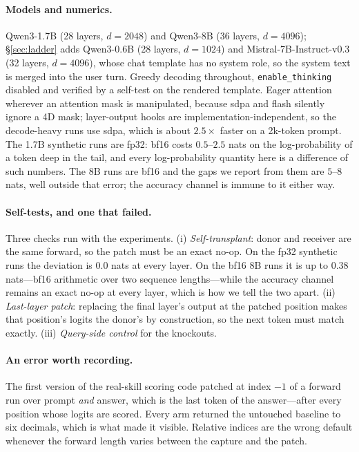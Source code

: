 \documentclass{article}
\begin{document}
\paragraph{Models and numerics.} Qwen3-1.7B (28 layers, $d=2048$) and Qwen3-8B
(36 layers, $d=4096$); \S\ref{sec:ladder} adds Qwen3-0.6B (28 layers, $d=1024$)
and Mistral-7B-Instruct-v0.3 (32 layers, $d=4096$), whose chat template has no
system role, so the system text is merged into the user turn. Greedy decoding throughout, \texttt{enable\_thinking}
disabled and verified by a self-test on the rendered template. Eager attention
wherever an attention mask is manipulated, because sdpa and flash silently
ignore a 4D mask; layer-output hooks are implementation-independent, so the
decode-heavy runs use sdpa, which is about $2.5\times$ faster on a 2k-token
prompt. The 1.7B synthetic runs are fp32: bf16 costs $0.5$--$2.5$ nats on the
log-probability of a token deep in the tail, and every log-probability quantity
here is a difference of such numbers. The 8B runs are bf16 and the gaps we
report from them are $5$--$8$ nats, well outside that error; the accuracy
channel is immune to it either way.

\paragraph{Self-tests, and one that failed.} Three checks run with the
experiments. (i) \emph{Self-transplant}: donor and receiver are the same
forward, so the patch must be an exact no-op. On the fp32 synthetic runs the
deviation is $0.0$ nats at every layer. On the bf16 8B runs it is up to $0.38$
nats---bf16 arithmetic over two sequence lengths---while the accuracy channel
remains an exact no-op at every layer, which is how we tell the two apart.
(ii) \emph{Last-layer patch}: replacing the final layer's output at the patched
position makes that position's logits the donor's by construction, so the next
token must match exactly. (iii) \emph{Query-side control} for the knockouts.

\paragraph{An error worth recording.} The first version of the real-skill
scoring code patched at index $-1$ of a forward run over prompt \emph{and}
answer, which is the last token of the answer---after every position whose
logits are scored. Every arm returned the untouched baseline to six decimals,
which is what made it visible. Relative indices are the wrong default whenever
the forward length varies between the capture and the patch.
\end{document}
